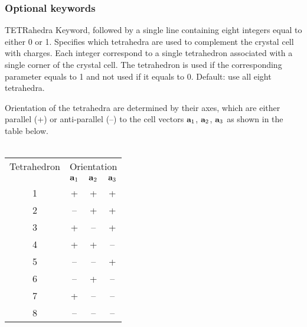 \subsubsection{Optional keywords}
\begin{keywordlist}
\item[TETRahedra]
Keyword, followed by a single line containing eight integers equal to either 0 or 1.
Specifies which tetrahedra are used to complement the crystal cell with  charges.
Each integer correspond to a single tetrahedron associated with a single corner of the crystal cell.
The tetrahedron is used if the corresponding parameter equals to 1 and not used if it equals to 0.
Default: use all eight tetrahedra.

Orientation of the tetrahedra are determined by their axes, which are either parallel (+) or anti-parallel (--) to the cell vectors
${\bf a}_1$, ${\bf a}_2$, ${\bf a}_3$ as shown in the table below. \\ \\
\begin{tabular}{c c c c}
\hline \hline
Tetrahedron & \multicolumn{3}{c}{Orientation} \\
                    & ${\bf a}_1$ & ${\bf a}_2$ & ${\bf a}_3$ \\
\hline
1 & + & + & + \\
2 & -- & + & + \\
3 & + & -- & + \\
4 & + & + & -- \\
5 & -- & -- & + \\
6 & -- & + & -- \\
7 & + & -- & -- \\
8 & -- & -- & -- \\
\hline \hline
\end{tabular}


\end{keywordlist}
